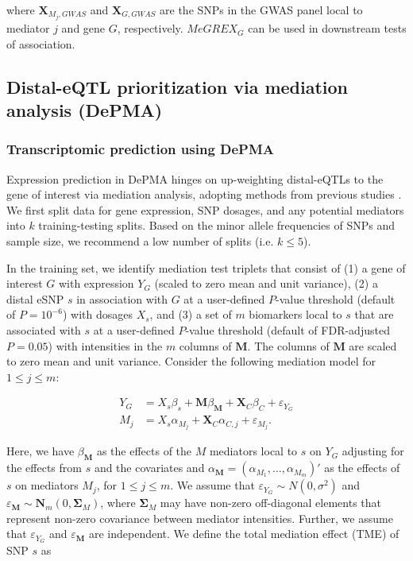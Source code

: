 \noindent where $\mathbf{X}_{M_j,GWAS}$ and $\mathbf{X}_{G,GWAS}$ 
are the SNPs in the GWAS
panel local to mediator $j$ and gene $G$, respectively.
$MeGREX_G$ can be used in downstream tests of association. 


\subsection{Distal-eQTL prioritization via mediation analysis (DePMA)}

\subsubsection{Transcriptomic prediction using DePMA}

Expression prediction in DePMA hinges on
up-weighting distal-eQTLs to the gene of interest
via mediation analysis, adopting
methods from previous studies \cite{Pierce2014,Shan2019,Yang2017}. 
We first split data for
gene expression, SNP dosages, and any potential mediators
into $k$ training-testing splits. Based on the 
minor allele frequencies of SNPs and sample size,
we recommend a low number of splits (i.e. $k \leq 5$).

In the training set, we identify mediation test triplets
that consist of (1) a gene of interest $G$
with expression $Y_G$ (scaled to zero mean
and unit variance), (2)
a distal eSNP $s$ in association
with $G$ at a user-defined $P$-value
threshold (default of $P = 10^{-6}$)
with dosages $X_s$, and (3)
a set of $m$ biomarkers local 
to $s$ that are associated
with $s$ at a user-defined $P$-value threshold
(default of FDR-adjusted $P = 0.05$)
with intensities in the $m$ columns of 
$\mathbf{M}$. The columns of $\mathbf{M}$
are scaled to zero mean and unit variance.
Consider the following
mediation model for $1 \leq j \leq m$:

\begin{equation}\label{mediation}
\begin{split}
Y_G & = X_s\beta_s + \mathbf{M}\beta_{\mathbf{M}} + \mathbf{X}_C\beta_{C} + \varepsilon_{Y_G} \\
M_j & = X_s\alpha_{M_j} + \mathbf{X}_C\alpha_{C,j} + \varepsilon_{M_j}.
\end{split}
\end{equation}

Here, we have $\beta_{\mathbf{M}}$ as the
effects of the $M$ mediators local to $s$ on $Y_G$ adjusting
for the effects from $s$ and the covariates and 
$\alpha_{\mathbf{M}} = (\alpha_{M_1},\ldots,\alpha_{M_m})'$
as the effects of $s$ on mediators $M_j$, for $1 \leq j \leq m$.
We assume that $\varepsilon_{Y_G} \sim N(0,\sigma^2)$ and 
$\varepsilon_{\mathbf{M}} \sim \mathbf{N}_m\left(0,\mathbf{\Sigma}_M\right)$,
where $\mathbf{\Sigma}_M$ may have non-zero off-diagonal
elements that
represent non-zero covariance between mediator
intensities. 
Further, we assume that $\varepsilon_{Y_G}$ and
$\varepsilon_{\mathbf{M}}$ are independent.
We define the total mediation effect
(TME) 
\cite{Sobel1982AsymptoticModels} of SNP $s$
as 


